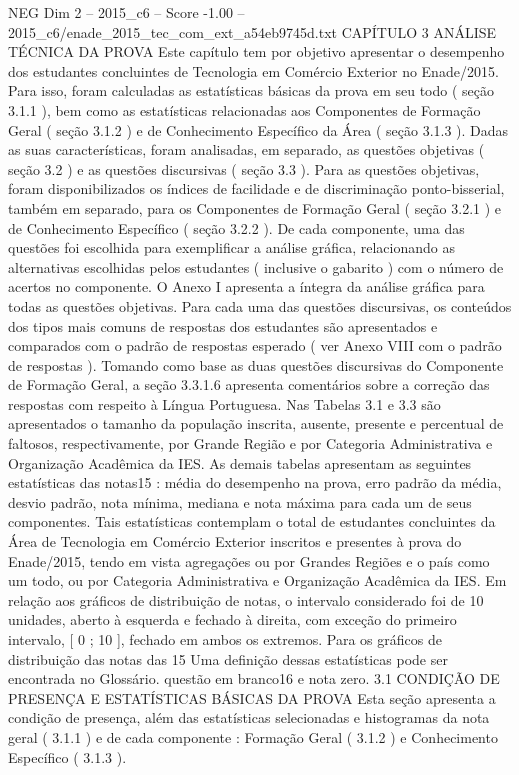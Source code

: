 \begin{textsample}{NEG Dim 2 – 2015\_c6 – Score -1.00 – 2015\_c6/enade\_2015\_tec\_com\_ext\_a54eb9745d.txt}  \label{ex:f2_neg_199}
CAPÍTULO 3 ANÁLISE TÉCNICA DA PROVA Este capítulo tem por objetivo apresentar o desempenho dos estudantes concluintes de Tecnologia em Comércio Exterior no Enade/2015.
Para isso, foram calculadas as estatísticas básicas da prova em seu todo ( seção 3.1.1 ), bem como as estatísticas relacionadas aos Componentes de Formação Geral ( seção 3.1.2 ) e de Conhecimento Específico da Área ( seção 3.1.3 ).
Dadas as suas características, foram analisadas, em separado, as questões objetivas ( seção 3.2 ) e as questões discursivas ( seção 3.3 ).
Para as questões objetivas, foram disponibilizados os índices de facilidade e de discriminação ponto-bisserial, também em separado, para os Componentes de Formação Geral ( seção 3.2.1 ) e de Conhecimento Específico ( seção 3.2.2 ).
De cada componente, uma das questões foi escolhida para exemplificar a análise gráfica, relacionando as alternativas escolhidas pelos estudantes ( inclusive o gabarito ) com o número de acertos no componente.
O Anexo I apresenta a íntegra da análise gráfica para todas as questões objetivas.
Para cada uma das questões discursivas, os conteúdos dos tipos mais comuns de respostas dos estudantes são apresentados e comparados com o padrão de respostas esperado ( ver Anexo VIII com o padrão de respostas ).
Tomando como base as duas questões discursivas do Componente de Formação Geral, a seção 3.3.1.6 apresenta comentários sobre a correção das respostas com respeito à Língua Portuguesa.
Nas Tabelas 3.1 e 3.3 são apresentados o tamanho da população inscrita, ausente, presente e percentual de faltosos, respectivamente, por Grande Região e por Categoria Administrativa e Organização Acadêmica da IES.
As demais tabelas apresentam as seguintes estatísticas das notas15 : média do desempenho na prova, erro padrão da média, desvio padrão, nota mínima, mediana e nota máxima para cada um de seus componentes.
Tais estatísticas contemplam o total de estudantes concluintes da Área de Tecnologia em Comércio Exterior inscritos e presentes à prova do Enade/2015, tendo em vista agregações ou por Grandes Regiões e o país como um todo, ou por Categoria Administrativa e Organização Acadêmica da IES.
Em relação aos gráficos de distribuição de notas, o intervalo considerado foi de 10 unidades, aberto à esquerda e fechado à direita, com exceção do primeiro intervalo, [ 0 ; 10 ], fechado em ambos os extremos.
Para os gráficos de distribuição das notas das 15 Uma definição dessas estatísticas pode ser encontrada no Glossário. questão em branco16 e nota zero. 3.1 CONDIÇÃO DE PRESENÇA E ESTATÍSTICAS BÁSICAS DA PROVA Esta seção apresenta a condição de presença, além das estatísticas selecionadas e histogramas da nota geral ( 3.1.1 ) e de cada componente : Formação Geral ( 3.1.2 ) e Conhecimento Específico ( 3.1.3 ).

\end{textsample}
